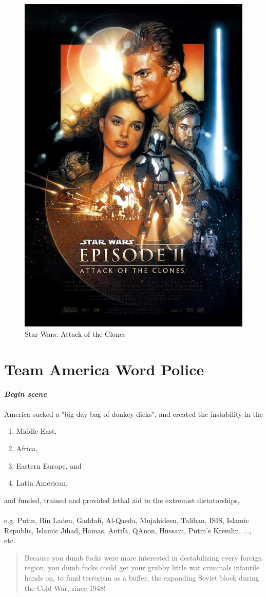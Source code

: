 \documentclass[16pt,openany,oneside]{book}
\begin{document}
\begin{figure}[H]
    \centering
    \includegraphics[width=0.5\linewidth]{assets/star_wars/attack_of_the_clones.jpg}
    \caption{Star Wars: Attack of the Clones}
    \label{fig:attack-of-the-clones-poster}
\end{figure}

\chapter{Team America Word Police}

\textbf{\textit{Begin scene}}
\\\\
\noindent America sucked a "big day bag of donkey dicks", 
\noindent and created the instability in the 

\begin{enumerate}
    \item Middle East, 
    \item Africa, 
    \item Eastern Europe, and
    \item Latin American,
\end{enumerate}

\noindent and funded, trained and provided lethal aid to the extremist dictatorships, 
\\\\
e.g. Putin, 
Bin Laden, 
Gaddafi, 
Al-Qaeda, 
Mujahideen, 
Taliban,
ISIS, 
Islamic Republic,
 Islamic Jihad,
 Hamas, 
Antifa, 
QAnon,
 Hussain, 
Putin's Kremlin, ..., etc.
\begin{quote}
    Because you dumb fucks were more interested in destabilizing every foreign region, you dumb fucks could get your grubby little war criminals infantile hands on, to fund terrorism as a buffer, the expanding Soviet block during the Cold War, since 1948!
\end{quote}
\end{document}
